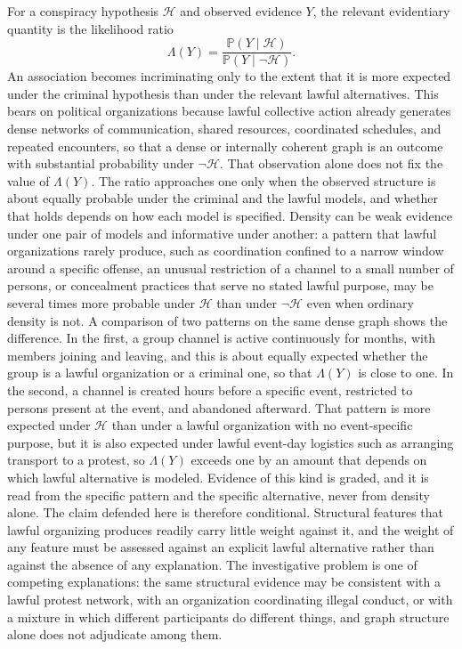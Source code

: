 \documentclass[11pt]{article}
\theoremstyle{definition}
\theoremstyle{remark}
\renewcommand{\Pr}{\mathbb{P}}
\begin{document}
For a conspiracy hypothesis $\mathcal{H}$ and observed evidence $Y$, the relevant evidentiary quantity is the likelihood ratio
\[
\Lambda(Y) = \frac{\Pr(Y \mid \mathcal{H})}{\Pr(Y \mid \neg \mathcal{H})}.
\]
An association becomes incriminating only to the extent that it is more expected under the criminal hypothesis than under the relevant lawful alternatives. This bears on political organizations because lawful collective action already generates dense networks of communication, shared resources, coordinated schedules, and repeated encounters, so that a dense or internally coherent graph is an outcome with substantial probability under $\neg \mathcal{H}$. That observation alone does not fix the value of $\Lambda(Y)$. The ratio approaches one only when the observed structure is about equally probable under the criminal and the lawful models, and whether that holds depends on how each model is specified. Density can be weak evidence under one pair of models and informative under another: a pattern that lawful organizations rarely produce, such as coordination confined to a narrow window around a specific offense, an unusual restriction of a channel to a small number of persons, or concealment practices that serve no stated lawful purpose, may be several times more probable under $\mathcal{H}$ than under $\neg \mathcal{H}$ even when ordinary density is not. A comparison of two patterns on the same dense graph shows the difference. In the first, a group channel is active continuously for months, with members joining and leaving, and this is about equally expected whether the group is a lawful organization or a criminal one, so that $\Lambda(Y)$ is close to one. In the second, a channel is created hours before a specific event, restricted to persons present at the event, and abandoned afterward. That pattern is more expected under $\mathcal{H}$ than under a lawful organization with no event-specific purpose, but it is also expected under lawful event-day logistics such as arranging transport to a protest, so $\Lambda(Y)$ exceeds one by an amount that depends on which lawful alternative is modeled. Evidence of this kind is graded, and it is read from the specific pattern and the specific alternative, never from density alone. The claim defended here is therefore conditional. Structural features that lawful organizing produces readily carry little weight against it, and the weight of any feature must be assessed against an explicit lawful alternative rather than against the absence of any explanation. The investigative problem is one of competing explanations: the same structural evidence may be consistent with a lawful protest network, with an organization coordinating illegal conduct, or with a mixture in which different participants do different things, and graph structure alone does not adjudicate among them.
\end{document}
